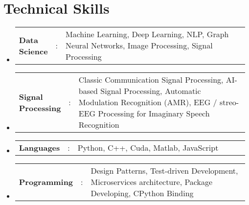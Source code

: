 \documentclass[a4paper,11pt]{article}
\newcommand{\resumeSectionType}[3]{
\item\begin{tabular*}{0.96\textwidth}[t]{
p{0.15\linewidth}p{0.02\linewidth}p{0.81\linewidth}
}
\textbf{#1} & #2 & #3
\end{tabular*}\vspace{-2pt}
}
\newcommand{\resumeHeadingListStart}{
\begin{itemize}[leftmargin=0.15in, label={}]
}
\newcommand{\resumeHeadingListEnd}{\end{itemize}}
\begin{document}

\section{Technical Skills}
\resumeHeadingListStart{}
\resumeSectionType{Data Science}{:}{Machine Learning, Deep Learning, NLP, Graph Neural Networks, Image Processing, Signal Processing}
\resumeSectionType{Signal Processing}{:}{Classic Communication Signal Processing, AI-based Signal Processing, Automatic Modulation Recognition (AMR), EEG / streo-EEG Processing for Imaginary Speech Recognition}
\resumeSectionType{Languages}{:}{Python, C++, Cuda, Matlab, JavaScript}
\resumeSectionType{Programming}{:}{Design Patterns, Test-driven Development, Microservices architecture, Package Developing, CPython Binding}
\resumeHeadingListEnd{}


\end{document}
